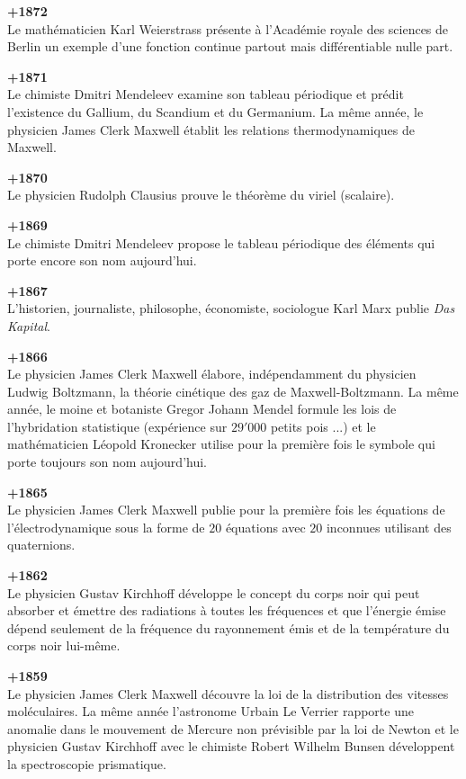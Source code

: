 \textbf{+1872}\\
Le mathématicien Karl Weierstrass présente à l'Académie royale des sciences de Berlin un exemple d'une fonction continue partout mais différentiable nulle part.

\textbf{+1871}\\
Le chimiste Dmitri Mendeleev examine son tableau périodique et prédit l'existence du Gallium, du Scandium et du Germanium. La même année, le physicien James Clerk Maxwell établit les relations thermodynamiques de Maxwell.

\textbf{+1870}\\
Le physicien Rudolph Clausius prouve le théorème du viriel (scalaire).

\textbf{+1869}\\
Le chimiste Dmitri Mendeleev propose le tableau périodique des éléments qui porte encore son nom aujourd'hui.

\textbf{+1867}\\
L'historien, journaliste, philosophe, économiste, sociologue Karl Marx publie \textit{Das Kapital}.

\textbf{+1866}\\
Le physicien James Clerk Maxwell élabore, indépendamment du physicien Ludwig Boltzmann, la théorie cinétique des gaz de Maxwell-Boltzmann. La même année, le moine et botaniste Gregor Johann Mendel formule les lois de l'hybridation statistique (expérience sur $29'000$ petits pois ...) et le mathématicien Léopold Kronecker utilise pour la première fois le symbole qui porte toujours son nom aujourd'hui.

\textbf{+1865}\\
Le physicien James Clerk Maxwell publie pour la première fois les équations de l'électrodynamique sous la forme de $20$ équations avec $20$ inconnues utilisant des quaternions.

\textbf{+1862}\\
Le physicien Gustav Kirchhoff développe le concept du corps noir qui peut absorber et émettre des radiations à toutes les fréquences et que l'énergie émise dépend seulement de la fréquence du rayonnement émis et de la température du corps noir lui-même.

\textbf{+1859}\\
Le physicien James Clerk Maxwell découvre la loi de la distribution des vitesses moléculaires. La même année l'astronome Urbain Le Verrier rapporte une anomalie dans le mouvement de Mercure non prévisible par la loi de Newton et le physicien Gustav Kirchhoff avec le chimiste Robert Wilhelm Bunsen développent la spectroscopie prismatique.

